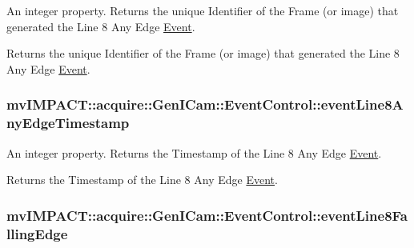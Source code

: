 An integer property. Returns the unique Identifier of the Frame (or image) that generated the Line 8 Any Edge \hyperlink{classmv_i_m_p_a_c_t_1_1acquire_1_1_event}{Event}. 

Returns the unique Identifier of the Frame (or image) that generated the Line 8 Any Edge \hyperlink{classmv_i_m_p_a_c_t_1_1acquire_1_1_event}{Event}. \hypertarget{classmv_i_m_p_a_c_t_1_1acquire_1_1_gen_i_cam_1_1_event_control_ac9dc59af14b4168a9d2ba02bf65ae8c4}{
\subsubsection[{event\+Line8\+Any\+Edge\+Timestamp}]{ mv\+I\+M\+P\+A\+C\+T\+::acquire\+::\+Gen\+I\+Cam\+::\+Event\+Control\+::event\+Line8\+Any\+Edge\+Timestamp}}\label{classmv_i_m_p_a_c_t_1_1acquire_1_1_gen_i_cam_1_1_event_control_ac9dc59af14b4168a9d2ba02bf65ae8c4}


An integer property. Returns the Timestamp of the Line 8 Any Edge \hyperlink{classmv_i_m_p_a_c_t_1_1acquire_1_1_event}{Event}. 

Returns the Timestamp of the Line 8 Any Edge \hyperlink{classmv_i_m_p_a_c_t_1_1acquire_1_1_event}{Event}. \hypertarget{classmv_i_m_p_a_c_t_1_1acquire_1_1_gen_i_cam_1_1_event_control_aa961cf572a13e71e60eb148719126584}{
\subsubsection[{event\+Line8\+Falling\+Edge}]{ mv\+I\+M\+P\+A\+C\+T\+::acquire\+::\+Gen\+I\+Cam\+::\+Event\+Control\+::event\+Line8\+Falling\+Edge}}\label{classmv_i_m_p_a_c_t_1_1acquire_1_1_gen_i_cam_1_1_event_control_aa961cf572a13e71e60eb148719126584}



